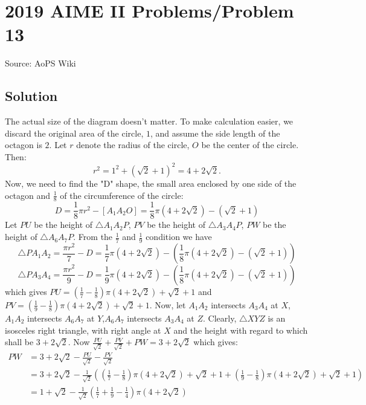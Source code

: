 \documentclass[12pt]{article}
\begin{document}
\section*{{2019 AIME II Problems/Problem 13}}
Source: AoPS Wiki

\subsection*{Solution}
The actual size of the diagram doesn't matter. To make calculation easier, we discard the original area of the circle, \(1\), and assume the side length of the octagon is \(2\). Let \(r\) denote the radius of the circle, \(O\) be the center of the circle. Then: \[r^2= 1^2 + \left(\sqrt{2}+1\right)^2= 4+2\sqrt{2}.\] Now, we need to find the "D" shape, the small area enclosed by one side of the octagon and \(\frac{1}{8}\) of the circumference of the circle: \[D= \frac{1}{8} \pi r^2 - [A_1 A_2 O]=\frac{1}{8} \pi \left(4+2\sqrt{2}\right)- \left(\sqrt{2}+1\right)\] Let \(PU\) be the height of \(\triangle A_1 A_2 P\), \(PV\) be the height of \(\triangle A_3 A_4 P\), \(PW\) be the height of \(\triangle A_6 A_7 P\). From the \(\frac{1}{7}\) and \(\frac{1}{9}\) condition we have \[\triangle P A_1 A_2= \frac{\pi r^2}{7} - D= \frac{1}{7} \pi \left(4+2\sqrt{2}\right)-\left(\frac{1}{8} \pi \left(4+2\sqrt{2}\right)- \left(\sqrt{2}+1\right)\right)\] \[\triangle P A_3 A_4= \frac{\pi r^2}{9} - D= \frac{1}{9} \pi \left(4+2\sqrt{2}\right)-\left(\frac{1}{8} \pi \left(4+2\sqrt{2}\right)- \left(\sqrt{2}+1\right)\right)\] which gives \(PU= \left(\frac{1}{7}-\frac{1}{8}\right) \pi \left(4+ 2\sqrt{2}\right) + \sqrt{2}+1\) and \(PV= \left(\frac{1}{9}-\frac{1}{8}\right) \pi \left(4+ 2\sqrt{2}\right) + \sqrt{2}+1\). Now, let \(A_1 A_2\) intersects \(A_3 A_4\) at \(X\), \(A_1 A_2\) intersects \(A_6 A_7\) at \(Y\),\(A_6 A_7\) intersects \(A_3 A_4\) at \(Z\). Clearly, \(\triangle XYZ\) is an isosceles right triangle, with right angle at \(X\) and the height with regard to which shall be \(3+2\sqrt2\). Now \(\frac{PU}{\sqrt{2}} + \frac{PV}{\sqrt{2}} + PW = 3+2\sqrt2\) which gives: \begin{align*}
PW&= 3+2\sqrt2-\frac{PU}{\sqrt{2}} - \frac{PV}{\sqrt{2}} \\
&=3+2\sqrt{2}-\frac{1}{\sqrt{2}}\left(\left(\frac{1}{7}-\frac{1}{8}\right) \pi \left(4+ 2\sqrt{2}\right) + \sqrt{2}+1+\left(\frac{1}{9}-\frac{1}{8}\right) \pi \left(4+ 2\sqrt{2}\right) + \sqrt{2}+1\right)\\
&=1+\sqrt{2}- \frac{1}{\sqrt{2}}\left(\frac{1}{7}+\frac{1}{9}-\frac{1}{4}\right)\pi\left(4+2\sqrt{2}\right)

\end{align*}
\end{document}
